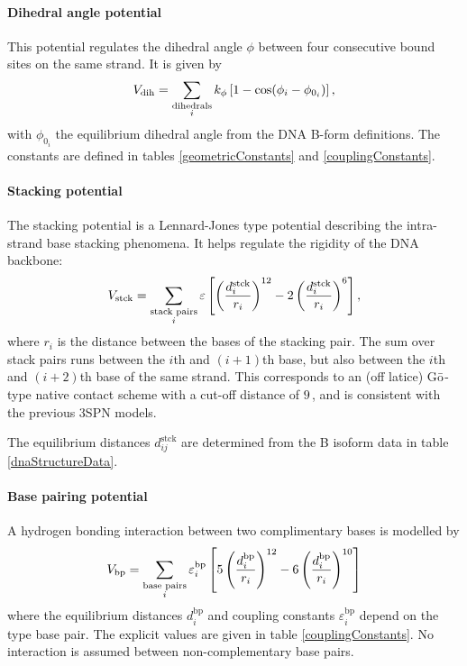 \paragraph{Dihedral angle potential}
This potential regulates the dihedral angle $\phi$ between four consecutive bound sites on the same strand. It is given by
\begin{equation}
V_\text{dih}
= \sum_{\substack{\text{dihedrals}\\i}}
	k_\phi \left[ 1 - \cos (\phi_i - \phi_{0_i}) \right],
\end{equation}
with $\phi_{0_i}$ the equilibrium dihedral angle from the DNA B-form definitions. The constants are defined in tables \ref{geometricConstants} and \ref{couplingConstants}.


\paragraph{Stacking potential}
The stacking potential is a Lennard-Jones type potential describing the intra-strand base stacking phenomena. It helps regulate the rigidity of the DNA backbone:
\begin{equation}
V_\text{stck}
= \sum_{\substack{\text{stack pairs}\\i}}
	\varepsilon \left[
       		   \left(\frac{d^\text{stck}_i}{r_i} \right)^{12}
       		- 2\left(\frac{d^\text{stck}_i}{r_i} \right)^{6}
       	\right],
\end{equation}
where $r_i$ is the distance between the bases of the stacking pair. The sum over stack pairs runs between the $i$th and $(i+1)$th base, but also between the $i$th and $(i+2)$th base of the same strand.
This corresponds to an (off latice) G$\bar{\text o}$-type native contact scheme\cite{hoangcieplak, cieplak2003folding} with a cut-off distance of $9$\,\Angstrom, and is consistent with the previous 3SPN models.

The equilibrium distances $d_{ij}^\text{stck}$ are determined from the B isoform data in table \ref{dnaStructureData}.


\paragraph{Base pairing potential}
A hydrogen bonding interaction between two complimentary bases is modelled by
\begin{equation}
V_\text{bp}
= \sum_{\substack{\text{base pairs}\\i}}
\varepsilon^\text{bp}_i \left[
	  5\left(\frac{d^\text{bp}_i}{r_i} \right)^{12}
	- 6\left(\frac{d^\text{bp}_i}{r_i} \right)^{10}
\right]
\end{equation}
where the equilibrium distances $d^\text{bp}_i$ and coupling constants $\varepsilon^\text{bp}_i$ depend on the type base pair. The explicit values are given in table \ref{couplingConstants}. No interaction is assumed between non-complementary base pairs.

